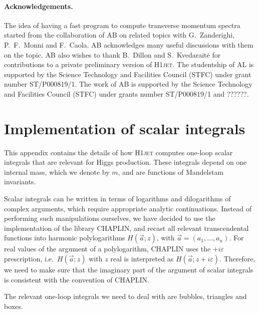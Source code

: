 \documentclass[12pt]{article}
\begin{document}
\paragraph{Acknowledgements.} The idea of having a fast program to
compute transverse momentum spectra started from the collaboration of
AB on related topics with G.~Zanderighi, P.~F.~Monni and F.~Caola. AB
acknowledges many useful discussions with them on the topic. AB also
wishes to thank B.~Dillon and S.~Kvedarait\.e for contributions to a
private preliminary version of \textsc{H1jet}. The studentship of AL is
supported by the Science Technology and Facilities Council (STFC)
under grant number ST/P000819/1. The work of AB is supported by the
Science Technology and Facilities Council (STFC) under grants number
ST/P000819/1 and ??????.

\appendix

\section{Implementation of scalar integrals}
\label{sec:scalar-integrals}

This appendix contains the details of how \textsc{H1jet} computes one-loop
scalar integrals that are relevant for Higgs production. These
integrals depend on one internal mass, which we denote by $m$, and are
functions of Mandelstam
invariants.

Scalar integrals can be written in terms of logarithms and dilogarithms of complex
arguments, which require appropriate analytic continuations. Instead of performing such manipulations ourselves, we have
decided to use the implementation of the library CHAPLIN, and recast all relevant transcendental
functions into harmonic polylogarithms $H(\vec a;z)$, with
$\vec a=(a_1,\dots,a_n)$. For real values of the argument of a polylogarithm, CHAPLIN
uses the $+i\varepsilon$ prescription, i.e.\ $H(\vec a;z)$ with $z$
real is interpreted as $H(\vec a;z+i\varepsilon)$. Therefore, we need
to make sure that the imaginary part of the argument of scalar
integrals is consistent with the convention of CHAPLIN.

The relevant one-loop integrals we need to deal with are  
bubbles, triangles and boxes.
\end{document}
